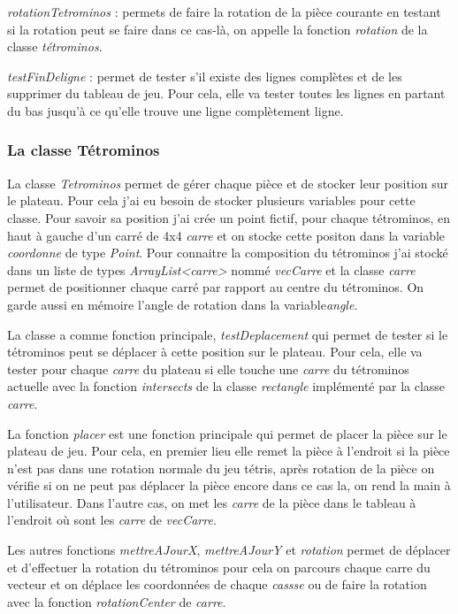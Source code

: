 \documentclass{article}           %
\begin{document}
\emph{rotationTetrominos} : permets de faire la rotation de la pièce courante en testant si la rotation peut se faire dans ce cas-là, on appelle la fonction \emph{rotation} de la classe \emph{tétrominos}.

\emph{testFinDeligne} : permet de tester s'il existe des lignes complètes et de les supprimer du tableau de jeu. Pour cela, elle va tester toutes les lignes en partant du bas jusqu'à ce qu'elle trouve une ligne complètement ligne.

\subsubsection{La classe Tétrominos}
La classe \emph{Tetrominos} permet de gérer chaque pièce et de stocker leur position sur le plateau. Pour cela j'ai eu besoin de stocker plusieurs variables pour cette classe.
Pour savoir sa position j'ai crée un point fictif, pour chaque tétrominos, en haut à gauche d'un carré de 4x4 \emph{carre} et on stocke cette positon dans la variable \emph{coordonne} de type \emph{Point}. Pour connaitre la composition du tétrominos j'ai stocké dans un liste de types \emph{ArrayList<carre>} nommé \emph {vecCarre} et la classe \emph {carre} permet de positionner chaque carré par rapport au centre du tétrominos. On garde aussi en mémoire l'angle de rotation dans la variable\emph{angle}.

La classe a comme fonction principale, \emph{testDeplacement} qui permet de tester si le tétrominos peut se déplacer à cette position sur le plateau. Pour cela, elle va tester pour chaque \emph{carre} du plateau si elle touche une \emph{carre} du tétrominos actuelle avec la fonction \emph{intersects} de la classe \emph{rectangle} implémenté par la classe \emph{carre}.

La fonction \emph{placer} est une fonction principale qui permet de placer la pièce sur le plateau de jeu. Pour cela, en premier lieu elle remet la pièce à l'endroit si la pièce n'est pas dans une rotation normale du jeu tétris, après rotation de la pièce on vérifie si on ne peut pas déplacer la pièce encore dans ce cas la, on rend la main à l'utilisateur. Dans l'autre cas, on met les \emph{carre} de la pièce dans le tableau à l'endroit où sont les \emph{carre} de \emph{vecCarre}.

Les autres fonctions \emph{mettreAJourX}, \emph{mettreAJourY} et \emph{rotation} permet de déplacer et d'effectuer la rotation du tétrominos pour cela on parcours chaque carre du vecteur et on déplace les coordonnées de chaque \emph{cassse} ou de faire la rotation avec la fonction \emph{rotationCenter} de \emph{carre}.
\end{document}
